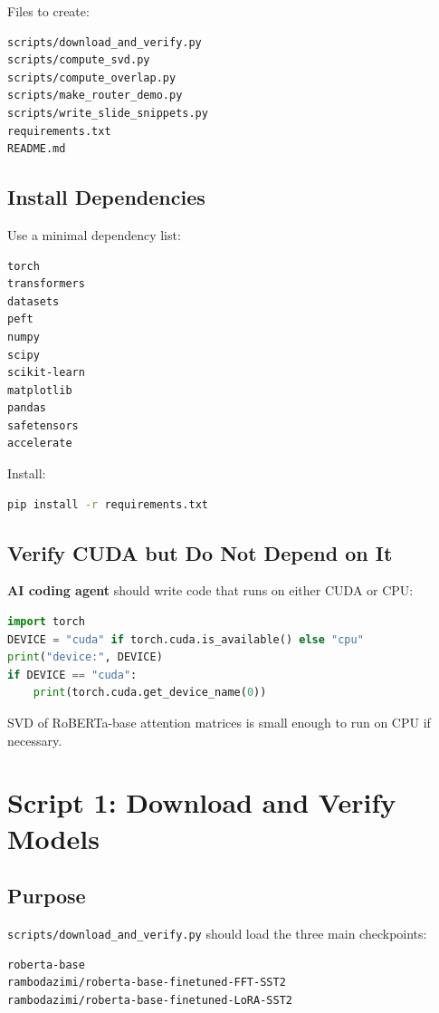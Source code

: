 \documentclass[11pt]{article}
\newcommand{\agent}{\textbf{AI coding agent}}
\begin{document}
Files to create:

\begin{lstlisting}
scripts/download_and_verify.py
scripts/compute_svd.py
scripts/compute_overlap.py
scripts/make_router_demo.py
scripts/write_slide_snippets.py
requirements.txt
README.md
\end{lstlisting}

\subsection{Install Dependencies}

Use a minimal dependency list:

\begin{lstlisting}
torch
transformers
datasets
peft
numpy
scipy
scikit-learn
matplotlib
pandas
safetensors
accelerate
\end{lstlisting}

Install:

\begin{lstlisting}[language=bash]
pip install -r requirements.txt
\end{lstlisting}

\subsection{Verify CUDA but Do Not Depend on It}

\agent{} should write code that runs on either CUDA or CPU:

\begin{lstlisting}[language=Python]
import torch
DEVICE = "cuda" if torch.cuda.is_available() else "cpu"
print("device:", DEVICE)
if DEVICE == "cuda":
    print(torch.cuda.get_device_name(0))
\end{lstlisting}

SVD of RoBERTa-base attention matrices is small enough to run on CPU if necessary.

\section{Script 1: Download and Verify Models}

\subsection{Purpose}

\texttt{scripts/download\_and\_verify.py} should load the three main checkpoints:

\begin{lstlisting}
roberta-base
rambodazimi/roberta-base-finetuned-FFT-SST2
rambodazimi/roberta-base-finetuned-LoRA-SST2
\end{lstlisting}
\end{document}
